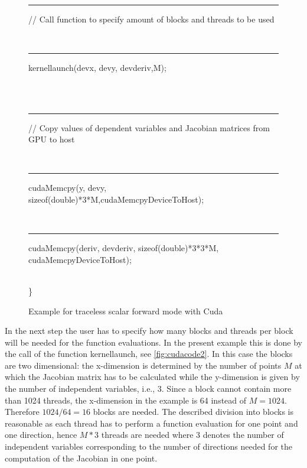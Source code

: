\documentclass[11pt,twoside]{article}
\begin{document}
\begin{figure}[!h!t!b]
{{\begin{tabbing}
\\
\> {\sf \rule{0.5cm}{0pt}// Call function to specify amount of blocks and threads to be used}\\
\> {\sf \rule{0.5cm}{0pt}kernellaunch(devx, devy, devderiv,M);}\\
\\
\> {\sf \rule{0.5cm}{0pt}// Copy values of dependent variables and Jacobian matrices from GPU to host}\\
\> {\sf \rule{0.5cm}{0pt}cudaMemcpy(y, devy, sizeof(double)*3*M,cudaMemcpyDeviceToHost);}\\
\> {\sf \rule{0.5cm}{0pt}cudaMemcpy(deriv, devderiv, sizeof(double)*3*3*M, cudaMemcpyDeviceToHost);}\\
\> {\sf \}}
\end{tabbing}
}}
\caption{Example for traceless scalar forward mode with Cuda}
\label{fig:cudacode1}
\end{figure}

In the next step the user has to specify how many blocks and threads per block
will be needed for the function evaluations. In the present example this is done by  
the call of the function {\sf kernellaunch}, see \autoref{fig:cudacode2}.
In this case the blocks are two dimensional: the x-dimension is determined
by the number of points $M$ at which the Jacobian matrix has to be calculated 
while the y-dimension is given by the number of independent variables, i.e., 3.
Since a block cannot contain more than 1024 threads, the
x-dimension in the example is 64 instead of $M=1024$. Therefore $1024/64=16$
blocks are needed. The described division into blocks is reasonable as each 
thread has to perform a function evaluation for one point and one direction,
hence $M*3$ threads are needed where 3 denotes the number of independent 
variables corresponding to the number of directions needed for the computation 
of the Jacobian in one point. 
\end{document}
